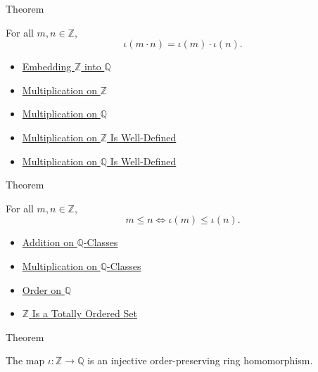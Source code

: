 \begin{theorembox}{Theorem}
\begin{theorem}
\label{thm:embedding-z-into-q-preserves-multiplication}
For all $m,n\in\mathbb{Z}$,
\[
\iota(m\cdot n)=\iota(m)\cdot\iota(n).
\]
\end{theorem}
\end{theorembox}

\begin{dependencies}
\begin{itemize}
  \item \hyperref[def:rational-chapter-embedding-z-into-q]{Embedding $\mathbb{Z}$ into $\mathbb{Q}$}
  \item \hyperref[def:multiplication-on-z-classes]{Multiplication on $\mathbb{Z}$}
  \item \hyperref[def:multiplication-on-q-classes]{Multiplication on $\mathbb{Q}$}
  \item \hyperref[thm:multiplication-on-z-well-defined]{Multiplication on $\mathbb{Z}$ Is Well-Defined}
  \item \hyperref[thm:multiplication-on-q-well-defined]{Multiplication on $\mathbb{Q}$ Is Well-Defined}
\end{itemize}
\end{dependencies}

\begin{theorembox}{Theorem}
\begin{theorem}
\label{thm:embedding-z-into-q-preserves-order}
For all $m,n\in\mathbb{Z}$,
\[
m\le n
\Longleftrightarrow
\iota(m)\le\iota(n).
\]
\end{theorem}
\end{theorembox}

\begin{dependencies}
\begin{itemize}
  \item \hyperref[def:addition-on-q-classes]{Addition on $\mathbb{Q}$-Classes}
  \item \hyperref[def:multiplication-on-q-classes]{Multiplication on $\mathbb{Q}$-Classes}
  \item \hyperref[def:order-on-q]{Order on $\mathbb{Q}$}
  \item \hyperref[thm:z-totally-ordered-set]{$\mathbb{Z}$ Is a Totally Ordered Set}
\end{itemize}
\end{dependencies}

\begin{theorembox}{Theorem}
\begin{theorem}
\label{thm:z-embeds-into-q}
The map $\iota:\mathbb{Z}\to\mathbb{Q}$ is an injective order-preserving ring
homomorphism.
\end{theorem}
\end{theorembox}

